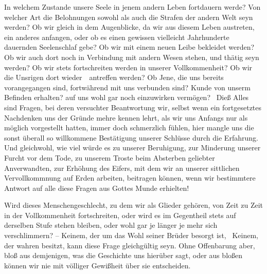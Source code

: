 \begin{aufza}
\item In welchem Zustande unsere Seele in jenem andern Leben fortdauern werde? Von welcher Art die Belohnungen sowohl als auch die Strafen der andern Welt seyn werden? Ob wir gleich in dem Augenblicke, da wir aus diesem Leben austreten, ein anderes anfangen, oder ob es einen gewissen vielleicht Jahrhunderte dauernden Seelenschlaf gebe? Ob wir mit einem neuen Leibe bekleidet werden? Ob wir auch dort noch in Verbindung mit andern Wesen stehen, und thätig seyn werden? Ob wir stets fortschreiten werden in unserer Vollkommenheit? Ob wir die Unsrigen dort wieder~\ antreffen werden? Ob Jene, die uns bereits vorangegangen sind, fortwährend mit uns verbunden sind? Kunde von unserm Befinden erhalten? auf uns wohl gar noch einzuwirken vermögen? \usw\ Dieß Alles sind Fragen, bei deren versuchter Beantwortung wir, selbst wenn ein fortgesetztes Nachdenken uns der Gründe mehre kennen lehrt, als wir uns Anfangs nur als möglich vorgestellt hatten, immer doch schmerzlich fühlen, hier mangle uns die sonst überall so willkommene Bestätigung unserer Schlüsse durch die Erfahrung. Und gleichwohl, wie viel würde es zu unserer Beruhigung, zur Minderung unserer Furcht vor dem Tode, zu unserem Troste beim Absterben geliebter Anverwandten, zur Erhöhung des Eifers, mit dem wir an unserer sittlichen Vervollkommnung auf Erden arbeiten, beitragen können, wenn wir bestimmtere Antwort auf alle diese Fragen aus Gottes Munde erhielten!
\item Wird dieses Menschengeschlecht, zu dem wir als Glieder gehören, von Zeit zu Zeit in der Vollkommenheit fortschreiten, oder wird es im Gegentheil stets auf derselben Stufe stehen bleiben, oder wohl gar je länger je mehr sich verschlimmern? -- Keinem, der um das Wohl seiner Brüder besorgt ist, \dh\ Keinem, der wahren  besitzt, kann diese Frage gleichgültig seyn. Ohne Offenbarung aber, bloß aus demjenigen, was die Geschichte uns hierüber sagt, oder aus bloßen  können wir nie mit völliger Gewißheit über sie entscheiden.
\end{aufza}

